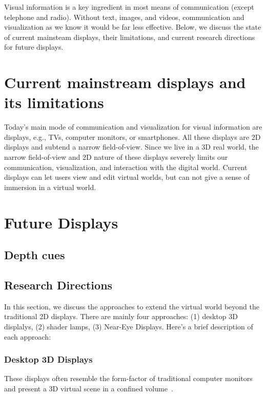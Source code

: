 Visual information is a key ingredient in most means of communication (except telephone and radio). 
Without text, images, and videos, communication and visualization as we know it would be far less effective. 
Below, we discuss the state of current mainsteam displays, their limitations, and current research directions for future displays.

\section{Current mainstream displays and its limitations}
Today's main mode of communication and visualization for visual information are displays, e.g., TVs, computer monitors, or smartphones.
All these displays are 2D displays and subtend a narrow field-of-view.
Since we live in a 3D real world, the narrow field-of-view and 2D nature of these displays severely limits our communication, visualization, and interaction with the digital world. 
Current displays can let users view and edit virtual worlds, but can not give a sense of immersion in a virtual world.

\section{Future Displays}

\subsection{Depth cues}


\subsection{Research Directions}
In this section, we discuss the approaches to extend the virtual world beyond the traditional 2D displays. 
There are mainly four approaches: 
(1) desktop 3D displalys, (2) shader lamps, (3) Near-Eye Displays. 
Here's a brief description of each approach:

\subsubsection{Desktop 3D Displays}
These displays often resemble the form-factor of traditional computer monitors and present a 3D virtual scene in a confined volume~. 


